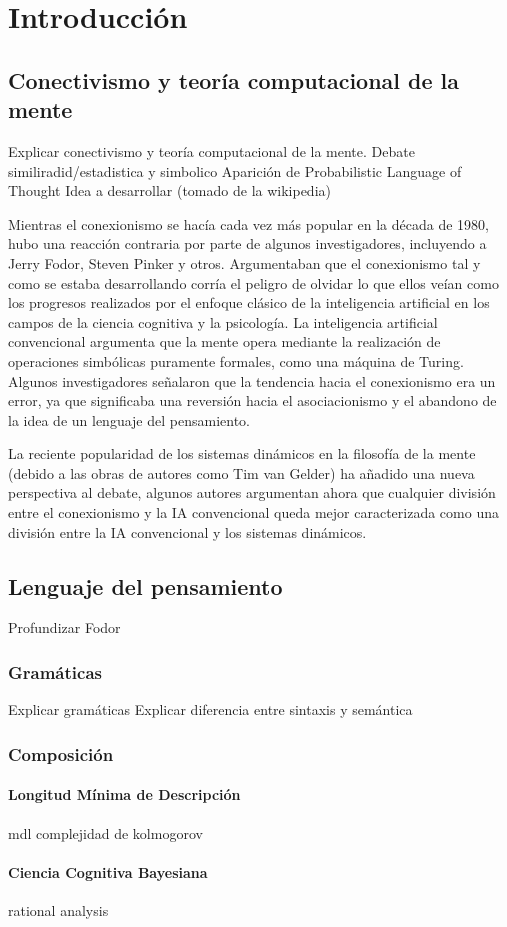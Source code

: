 \chapter{Introducción}
\label{intro}
\section{Conectivismo y teoría computacional de la mente}
Explicar conectivismo y teoría computacional de la mente.
Debate similiradid/estadistica y simbolico
Aparición de Probabilistic Language of Thought
Idea a desarrollar (tomado de la wikipedia)

Mientras el conexionismo se hacía cada vez más popular en la década de 1980, hubo una reacción contraria por parte de algunos investigadores, incluyendo a Jerry Fodor, Steven Pinker y otros. Argumentaban que el conexionismo tal y como se estaba desarrollando corría el peligro de olvidar lo que ellos veían como los progresos realizados por el enfoque clásico de la inteligencia artificial en los campos de la ciencia cognitiva y la psicología. La inteligencia artificial convencional argumenta que la mente opera mediante la realización de operaciones simbólicas puramente formales, como una máquina de Turing. Algunos investigadores señalaron que la tendencia hacia el conexionismo era un error, ya que significaba una reversión hacia el asociacionismo y el abandono de la idea de un lenguaje del pensamiento.

La reciente popularidad de los sistemas dinámicos en la filosofía de la mente (debido a las obras de autores como Tim van Gelder) ha añadido una nueva perspectiva al debate, algunos autores argumentan ahora que cualquier división entre el conexionismo y la IA convencional queda mejor caracterizada como una división entre la IA convencional y los sistemas dinámicos.

\section{Lenguaje del pensamiento}
Profundizar Fodor

\subsection{Gramáticas}
Explicar gramáticas
Explicar diferencia entre sintaxis y semántica

\subsection{Composición}
\subsubsection{Longitud Mínima de Descripción}
mdl
complejidad de kolmogorov
\subsubsection{Ciencia Cognitiva Bayesiana}
rational analysis
